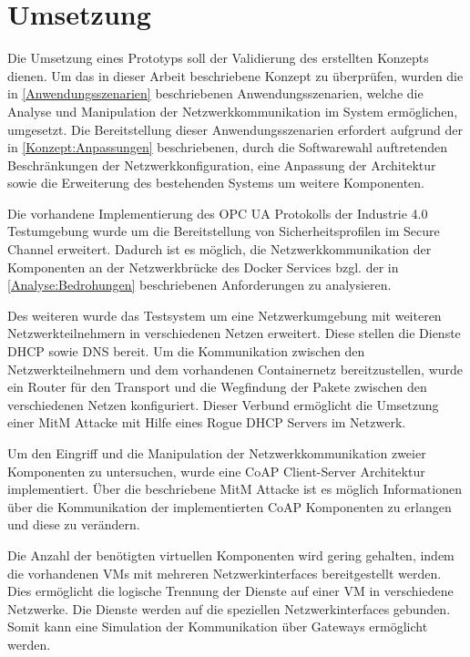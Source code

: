 \chapter{Umsetzung}
Die Umsetzung eines Prototyps soll der Validierung des erstellten Konzepts dienen. Um das in dieser Arbeit beschriebene Konzept zu überprüfen, wurden die in \autoref{Anwendungsszenarien} beschriebenen Anwendungsszenarien, welche die Analyse und Manipulation der Netzwerkkommunikation im System ermöglichen, umgesetzt. Die Bereitstellung dieser Anwendungsszenarien erfordert aufgrund der in \autoref{Konzept:Anpassungen} beschriebenen, durch die Softwarewahl auftretenden Beschränkungen der Netzwerkkonfiguration, eine Anpassung der Architektur sowie die Erweiterung des bestehenden Systems um weitere Komponenten.

Die vorhandene Implementierung des \ac{OPC UA} Protokolls der Industrie 4.0 Testumgebung wurde um die Bereitstellung von Sicherheitsprofilen im Secure Channel erweitert. Dadurch ist es möglich, die Netzwerkkommunikation der Komponenten an der Netzwerkbrücke des Docker Services bzgl. der in \autoref{Analyse:Bedrohungen} beschriebenen Anforderungen zu analysieren. 

Des weiteren wurde das Testsystem um eine Netzwerkumgebung mit weiteren Netzwerkteilnehmern in verschiedenen Netzen erweitert. Diese stellen die Dienste DHCP sowie DNS bereit. Um die Kommunikation zwischen den Netzwerkteilnehmern und dem vorhandenen Containernetz bereitzustellen, wurde ein Router für den Transport und die Wegfindung der Pakete zwischen den verschiedenen Netzen konfiguriert. Dieser Verbund ermöglicht die Umsetzung einer \ac{MitM} Attacke mit Hilfe eines Rogue \ac{DHCP} Servers im Netzwerk.

Um den Eingriff und die Manipulation der Netzwerkkommunikation zweier Komponenten zu untersuchen, wurde eine \ac{CoAP} Client-Server Architektur implementiert. Über die beschriebene \ac{MitM} Attacke ist es möglich Informationen über die Kommunikation der implementierten \ac{CoAP} Komponenten zu erlangen und diese zu verändern.

Die Anzahl der benötigten virtuellen Komponenten wird gering gehalten, indem die vorhandenen \ac{VM}s mit mehreren Netzwerkinterfaces bereitgestellt werden. Dies ermöglicht die logische Trennung der Dienste auf einer \ac{VM} in verschiedene Netzwerke. Die Dienste werden auf die speziellen Netzwerkinterfaces gebunden. Somit kann eine Simulation der Kommunikation über Gateways ermöglicht werden.

